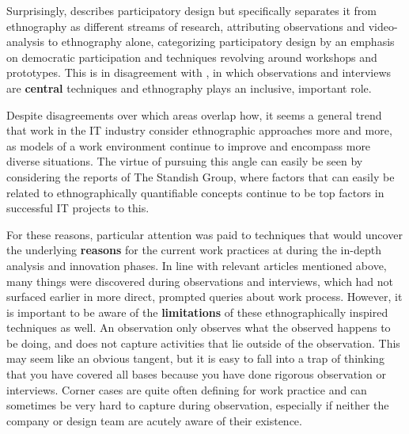 Surprisingly, \cite{kujala2003user} describes participatory design but specifically separates it from
ethnography as different streams of research, attributing observations and video-analysis to ethnography 
alone, categorizing participatory design by an emphasis on democratic participation and techniques revolving 
around workshops and prototypes. This is in disagreement with \cite{bodker204participatory}, in which
observations and interviews are \textbf{central} techniques and ethnography plays an inclusive, important role.

Despite disagreements over which areas overlap how, it seems a general trend that work in the IT industry consider
ethnographic approaches more and more, as models of a work environment continue to improve and encompass more diverse
situations. The virtue of pursuing this angle can easily be seen by considering the reports of The Standish Group, where
factors that can easily be related to ethnographically quantifiable concepts continue to be top factors in successful IT
projects to this\cite{standish2012}.

For these reasons, particular attention was paid to techniques that would uncover the underlying \textbf{reasons} for
the current work practices at \gomonkey{} during the in-depth analysis and innovation phases. In line with relevant
articles mentioned above, many things were discovered during observations and interviews, which had not surfaced earlier
in more direct, prompted queries about work process. However, it is important to be aware of the \textbf{limitations} of
these ethnographically inspired techniques as well. An observation only observes what the observed happens to be doing, and
does not capture activities that lie outside of the observation. This may seem like an obvious tangent, but it is easy to fall
into a trap of thinking that you have covered all bases because you have done rigorous observation or interviews. Corner cases
are quite often defining for work practice and can sometimes be very hard to capture during observation, especially if neither
the company or design team are acutely aware of their existence.

